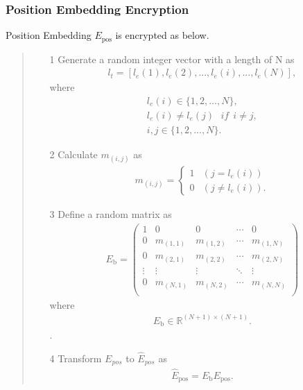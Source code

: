 \documentclass[conference, a4paper]{IEEEtran}
\begin{document}
\subsubsection{Position Embedding Encryption}
Position Embedding $E_{\text{pos}}$ is encrypted as below.
\begin{quote}
 \begin{itemize}
  \item[1] Generate a random integer vector with a length of N as 
  \begin{align}
    l_t = [l_e(1), l_e(2), ..., l_e(i),..., l_e(N)],
  \end{align}
  where
  \begin{align}
     l_e(i) \in\{1,2,...,N \}, \nonumber \\
     l_e(i) \neq l_e(j) ~~~if ~~i \neq j, \nonumber \\
     i, j \in \{ 1,2,...,N\} \nonumber.
  \end{align}
  \item[2] Calculate $m_{(i,j)}$ as
  \begin{align}
    m_{(i,j)} =
    \begin{cases}
        1 & (j = l_e(i)) \\
        0 & (j \neq l_e(i)) .
    \end{cases}
  \end{align}
  \item[3] Define a random matrix as
\begin{align}
    E_\text{b} = 
    \begin{pmatrix}
        1 & 0 & 0 & \cdots & 0 \\
        0 & m_{(1,1)} & m_{(1,2)} & \cdots & m_{(1,N)} \\
        0 & m_{(2,1)} & m_{(2,2)} & \cdots & m_{(2,N)} \\
        \vdots & \vdots & \vdots & \ddots & \vdots \\
        0 & m_{(N,1)} & m_{(N,2)} & \cdots & m_{(N,N)} \\
    \end{pmatrix}
\end{align}
where
\begin{align}
    E_\text{b} \in{\mathbb{R}^{(N+1) \times (N+1)}} \nonumber.
\end{align}
.
  \item[4] Transform $E_{pos}$ to $\widehat{E}_{pos}$ as
\begin{align}
    \widehat{E}_{\text{pos}} = E_{\text{b}} E_{\text{pos}}.
\end{align}

 \end{itemize}
\end{quote}
\end{document}
